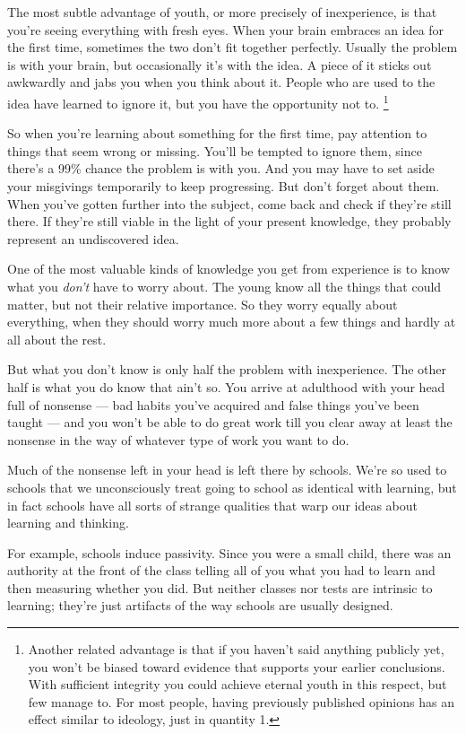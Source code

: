 \documentclass[12pt]{book}
\begin{document}
The most subtle advantage of youth, or more precisely of inexperience,
is that you're seeing everything with fresh eyes. When your brain
embraces an idea for the first time, sometimes the two don't fit
together perfectly. Usually the problem is with your brain, but
occasionally it's with the idea. A piece of it sticks out awkwardly and
jabs you when you think about it. People who are used to the idea have
learned to ignore it, but you have the opportunity not to.
\footnote{Another related advantage is that if you haven't said anything
publicly yet, you won't be biased toward evidence that supports your
earlier conclusions. With sufficient integrity you could achieve eternal
youth in this respect, but few manage to. For most people, having
previously published opinions has an effect similar to ideology, just in
quantity 1.}

So when you're learning about something for the first time, pay
attention to things that seem wrong or missing. You'll be tempted to
ignore them, since there's a 99\% chance the problem is with you. And
you may have to set aside your misgivings temporarily to keep
progressing. But don't forget about them. When you've gotten further
into the subject, come back and check if they're still there. If they're
still viable in the light of your present knowledge, they probably
represent an undiscovered idea.

One of the most valuable kinds of knowledge you get from experience is
to know what you \emph{don't} have to worry about. The young know all
the things that could matter, but not their relative importance. So they
worry equally about everything, when they should worry much more about a
few things and hardly at all about the rest.

But what you don't know is only half the problem with inexperience. The
other half is what you do know that ain't so. You arrive at adulthood
with your head full of nonsense --- bad habits you've acquired and false
things you've been taught --- and you won't be able to do great work
till you clear away at least the nonsense in the way of whatever type of
work you want to do.

Much of the nonsense left in your head is left there by schools. We're
so used to schools that we unconsciously treat going to school as
identical with learning, but in fact schools have all sorts of strange
qualities that warp our ideas about learning and thinking.

For example, schools induce passivity. Since you were a small child,
there was an authority at the front of the class telling all of you what
you had to learn and then measuring whether you did. But neither classes
nor tests are intrinsic to learning; they're just artifacts of the way
schools are usually designed.
\end{document}
